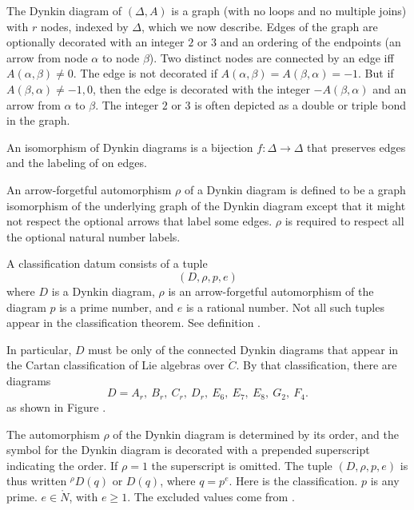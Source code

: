The Dynkin diagram of $(\Delta,A)$ is a graph (with no loops and no
multiple joins) with $r$ nodes, indexed by $\Delta$, which we now
describe.  Edges of the graph are optionally decorated with an integer
$2$ or $3$ and an ordering of the endpoints (an arrow from node
$\alpha$ to node $\beta$).  Two distinct nodes are connected by an
edge iff $A(\alpha,\beta)\ne 0$.  The edge is not decorated if
$A(\alpha,\beta)=A(\beta,\alpha)=-1$.  But if $A(\beta,\alpha)\ne
-1,0$, then the edge is decorated with the integer $-A(\beta,\alpha)$
and an arrow from $\alpha$ to $\beta$.  The integer $2$ or $3$ is
often depicted as a double or triple bond in the graph.

An isomorphism of Dynkin diagrams is a bijection $f:\Delta\to\Delta$
that preserves edges and the labeling of on edges.

An arrow-forgetful automorphism $\rho$ of a Dynkin diagram is defined
to be a graph isomorphism of the underlying graph of the Dynkin diagram
except that it might not respect the optional arrows that label some edges.
$\rho$ is required to respect all the optional natural number labels.


A classification datum consists of a tuple
\[
(D,\rho,p,e)
\]
where $D$ is a Dynkin diagram, $\rho$ is an arrow-forgetful
automorphism of the diagram $p$ is a prime number, and $e$ is a
rational number.  Not all such tuples appear in the classification
theorem.  See definition
\label{def:st}.

In particular, $D$ must be only of the connected Dynkin diagrams that
appear in the Cartan classification of Lie algebras over $\ring{C}$.
By that classification, there are diagrams
\[
D = A_r,~ B_r,~ C_r,~ D_r,~ E_6,~ E_7,~ E_8,~ G_2,~ F_4.
\]
as shown in Figure .

The automorphism $\rho$ of the Dynkin diagram is determined by its
order, and the symbol for the Dynkin diagram is decorated with a
prepended superscript indicating the order.  If $\rho=1$ the
superscript is omitted.  The tuple $(D,\rho,p,e)$ is thus written
${}^\rho D(q)$ or $D(q)$, where $q=p^e$.  Here is the classification.
$p$ is any prime. $e\in\ring{N}$, with $e\ge 1$.  The excluded values
come from \cite{Wiki}.

